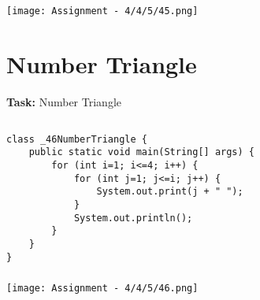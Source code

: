 \documentclass[12pt,a4paper]{article}
\begin{document}
\subsubsection{}
\begin{center}
    \texttt{[image: Assignment - 4/4/5/45.png]}
\end{center}


\section{Number Triangle}
\textbf{Task:} Number Triangle

\subsection{}
\begin{lstlisting}
class _46NumberTriangle {
    public static void main(String[] args) {
        for (int i=1; i<=4; i++) {
            for (int j=1; j<=i; j++) {
                System.out.print(j + " ");
            }
            System.out.println();
        }
    }
}
\end{lstlisting}

\subsubsection{}
\begin{center}
    \texttt{[image: Assignment - 4/4/5/46.png]}
\end{center}
\end{document}
